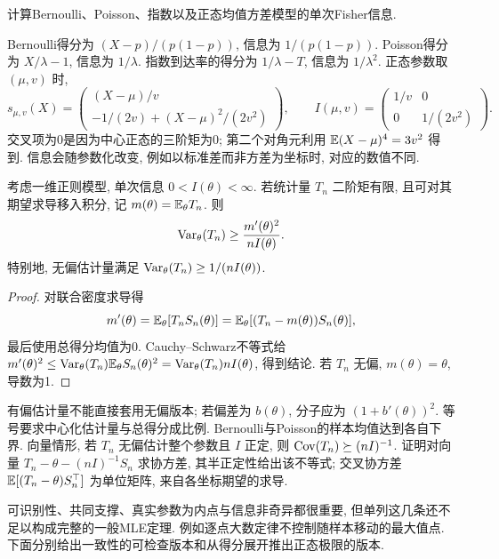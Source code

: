 \begin{example}
计算Bernoulli、Poisson、指数以及正态均值方差模型的单次Fisher信息.
\end{example}
\begin{solution}
Bernoulli得分为 $(X-p)/(p(1-p))$, 信息为 $1/(p(1-p))$. Poisson得分为 $X/\lambda-1$, 信息为 $1/\lambda$. 指数到达率的得分为 $1/\lambda-T$, 信息为 $1/\lambda^2$. 正态参数取 $(\mu,v)$ 时,
\[
 s_{\mu,v}(X)=\begin{pmatrix}(X-\mu)/v\\-1/(2v)+(X-\mu)^2/(2v^2)\end{pmatrix},
 \qquad I(\mu,v)=\begin{pmatrix}1/v&0\\0&1/(2v^2)\end{pmatrix}.
\]
交叉项为0是因为中心正态的三阶矩为0; 第二个对角元利用 $\mathbb E(X-\mu)^4=3v^2$ 得到. 信息会随参数化改变, 例如以标准差而非方差为坐标时, 对应的数值不同.
\end{solution}

\begin{theorem}
考虑一维正则模型, 单次信息 $0<I(\theta)<\infty$. 若统计量 $T_n$ 二阶矩有限, 且可对其期望求导移入积分, 记 $m(\theta)=\mathbb E_\theta T_n$. 则
\[
 \operatorname{Var}_\theta(T_n)\ge\frac{m'(\theta)^2}{nI(\theta)}.
\]
特别地, 无偏估计量满足 $\operatorname{Var}_\theta(T_n)\ge1/(nI(\theta))$.
\end{theorem}
\begin{proof}
对联合密度求导得
\[
 m'(\theta)=\mathbb E_\theta[T_n S_n(\theta)]
 =\mathbb E_\theta[(T_n-m(\theta))S_n(\theta)],
\]
最后使用总得分均值为0. Cauchy--Schwarz不等式给
$m'(\theta)^2\le\operatorname{Var}_\theta(T_n)\mathbb E_\theta S_n(\theta)^2
=\operatorname{Var}_\theta(T_n)nI(\theta)$, 得到结论. 若 $T_n$ 无偏, $m(\theta)=\theta$, 导数为1.
\end{proof}
有偏估计量不能直接套用无偏版本; 若偏差为 $b(\theta)$, 分子应为 $(1+b'(\theta))^2$. 等号要求中心化估计量与总得分成比例. Bernoulli与Poisson的样本均值达到各自下界. 向量情形, 若 $T_n$ 无偏估计整个参数且 $I$ 正定, 则 $\operatorname{Cov}(T_n)\succeq(nI)^{-1}$. 证明对向量 $T_n-\theta-(nI)^{-1}S_n$ 求协方差, 其半正定性给出该不等式; 交叉协方差 $\mathbb E[(T_n-\theta)S_n^\top]$ 为单位矩阵, 来自各坐标期望的求导.

可识别性、共同支撑、真实参数为内点与信息非奇异都很重要, 但单列这几条还不足以构成完整的一般MLE定理. 例如逐点大数定律不控制随样本移动的最大值点. 下面分别给出一致性的可检查版本和从得分展开推出正态极限的版本.

